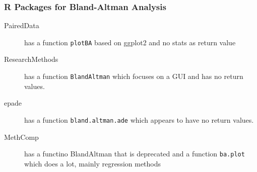 \documentclass[compress]{beamer}        %
\begin{document}
		\begin{frame}
			\frametitle{R Packages for Bland-Altman Analysis}
			\large
			\begin{description}
				\item[PairedData] has a function \texttt{plotBA} based on ggplot2 and no stats as return value
				\item[ResearchMethods] has a function \texttt{BlandAltman} which focuses on a GUI and has no return values.
				\item[epade] has a function \texttt{bland.altman.ade} which appears to have no return values.
				\item[MethComp] has a functino BlandAltman that is deprecated and a function \texttt{ba.plot} which does a lot, mainly regression methods
			\end{description}
		\end{frame}
\end{document}
